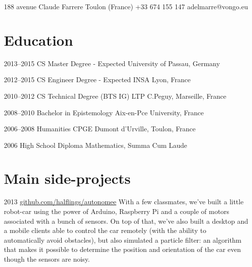 \documentclass{tccv}
\begin{document}
\personal
    {188 avenue Claude Farrere  Toulon (France)}
    {+33 674 155 147}
    {adelmarre@vongo.eu}

\section{Education}

\begin{yearlist}

\item{2013--2015}
     {CS Master Degree - Expected}
     {University of Passau, Germany}
     
\item{2012--2015}
     {CS Engineer Degree - Expected}
     {INSA Lyon, France}
     
\item{2010--2012}
     {CS Technical Degree (BTS IG)}
     {LTP C.Peguy, Marseille, France}
     
\item{2008--2010}
     {Bachelor in Epistemology}
     {Aix-en-Pce University, France}
     
\item{2006--2008}
     {Humanities CPGE}
     {Dumont d'Urville, Toulon, France}

\item{2006}
     {High School Diploma}
     {Mathematics, Summa Cum Laude}

\end{yearlist}

\section{Main side-projects}

\begin{yearlist}

\item{2013}
     {\href{https://github.com/halflings/autonomee}{github.com/halflings/autonomee}}
     {With a few classmates, we've built a little robot-car using the power of Arduino, Raspberry Pi and a couple of motors associated with a bunch of sensors. On top of that, we've also built a desktop and a mobile clients able to control the car remotely (with the ability to automatically avoid obstacles), but also simulated a particle filter: an algorithm that makes it possible to determine the position and orientation of the car even though the sensors are noisy.}

\end{yearlist}
\end{document}
